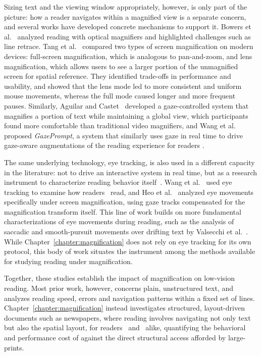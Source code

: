 Sizing text and the viewing window appropriately, however, is only part of the picture: how a reader navigates within a magnified view is a separate concern, and several works have developed concrete mechanisms to support it. Bowers et al.~\cite{bowers-reading} analyzed reading with optical magnifiers and highlighted challenges such as line retrace. Tang et al.~\cite{tang_screen_2023} compared two types of screen magnification on modern devices: full-screen magnification, which is analogous to pan-and-zoom, and lens magnification, which allows users to see a larger portion of the unmagnified screen for spatial reference. They identified trade-offs in performance and usability, and showed that the lens mode led to more consistent and uniform mouse movements, whereas the full mode caused longer and more frequent pauses. Similarly, Aguilar and Castet~\cite{aguilar-castet2017} developed a gaze-controlled system that magnifies a portion of text while maintaining a global view, which participants found more comfortable than traditional video magnifiers, and Wang et al.~\cite{wang_gazeprompt_2024} proposed \emph{GazePrompt}, a system that similarly uses gaze in real time to drive gaze-aware augmentations of the reading experience for readers \LV.

The same underlying technology, eye tracking, is also used in a different capacity in the literature: not to drive an interactive system in real time, but as a research instrument to characterize reading behavior itself~\cite{jacob_eye_2003}. Wang et al.~\cite{wang_understanding_2023} used eye tracking to examine how readers \LV\ read, and Heo et al.~\cite{heo_reading_2024} analyzed eye movements specifically under screen magnification, using gaze tracks compensated for the magnification transform itself. This line of work builds on more fundamental characterizations of eye movements during reading, such as the analysis of saccadic and smooth-pursuit movements over drifting text by Valsecchi et al.~\cite{valsecchi_saccadic_2013}. While Chapter~\ref{chapter:magnification} does not rely on eye tracking for its own protocol, this body of work situates the instrument among the methods available for studying reading under magnification.

Together, these studies establish the impact of magnification on low-vision reading. Most prior work, however, concerns plain, unstructured text, and analyzes reading speed, errors and navigation patterns within a fixed set of lines. Chapter~\ref{chapter:magnification} instead investigates structured, layout-driven documents such as newspapers, where reading involves navigating not only text but also the spatial layout, for readers \NV\ and \LV\ alike, quantifying the behavioral and performance cost of \condone against the direct structural access afforded by large-prints.

